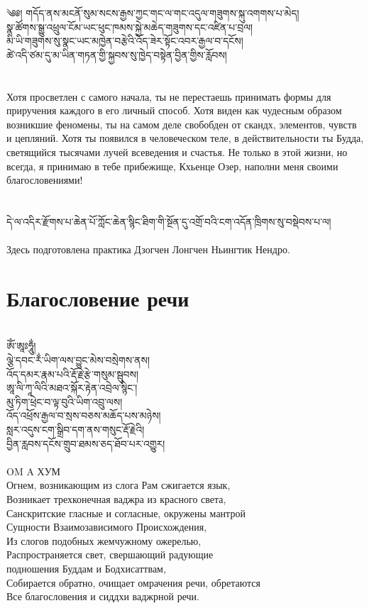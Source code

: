 \small
\ti
༄༅། གདོད་ནས་མངནོ་སུམ་སངས་རྒྱས་ཀྱང་གང་ལ་གང་འདུལ་གཟུགས་སྐུ་འགགས་པ་མེད།\\
སྣ་ཚོགས་སྒྱུ་འཕྲུལ་ངོམ་ཡང་ཕུང་ཁམས་སྐྱེ་མཆེད་གཟུགས་དང་འཛིན་པ་བྲལ།\\
མི་ཡི་གཟུགས་སུ་སྣང་ཡང་མཁྱེན་བརྩེའི་འོད་ཟེར་སྟོང་འབར་རྒྱལ་བ་དངོས།\\
ཚེ་འདི་ཙམ་དུ་མ་ཡིན་གཏན་གྱི་སྐྱབས་སུ་ཁྱེད་བསྟེན་བྱིན་གྱིས་རློབས།\\
\\
\\
\ru
Хотя просветлен с самого начала, ты не перестаешь принимать
формы для приручения каждого в его личный способ.
Хотя виден как чудесным образом возникшие феномены,
ты на самом деле свобобден от скандх, элементов, чувств и цепляний.
Хотя ты появился в человеческом теле, в действительности ты Будда,
светящийся тысячами лучей всеведения и счастья.
Не только в этой жизни, но всегда, я принимаю в тебе прибежище,
Кхьенце Озер, наполни меня своими благословениями!\\
\\
\vspace{0.5cm}
\\
\scriptsize
\ti དེ་ལ་འདིར་རྫོགས་པ་ཆེན་པོ་ཀློང་ཆེན་སྙིང་ཐིག་གི་སྔོན་དུ་འགྲོ་བའི་ངག་འདོན་ཁྲིགས་སུ་བསྡེབས་པ་ལ།\\
\\
\ru Здесь подготовлена практика Дзогчен Лонгчен Ньингтик Нендро.\\


\normalsize
\newpage
\section*{Благословение речи}
\\
\ti
ཨོཾ་ཨཱཿཧཱུྂ།\\
ལྕེ་དབང་རྂ་ཡིག་ལས་བྱུང་མེས་བསྲེགས་ནས། \\
འོད་དམར་རྣམ་པའི་རྡོ་རྗེ་རྩེ་གསུམ་སྦུབས།\\
ཨཱ་ལི་ཀཱ་ལིའི་མཐའ་སྐོར་རྟེན་འབྲེལ་སྙིང་།\\
མུ་ཏིག་ཕྲེང་བ་ལྟ་བུའི་ཡིག་འབྲུ་ལས།\\
འོད་འཕྲོས་རྒྱལ་བ་སྲས་བཅས་མཆོད་པས་མཉེས།\\
སླར་འདུས་ངག་སྒྲིབ་དག་ནས་གསུང་རྡོ་རྗེའི།\\
བྱིན་རླབས་དངོས་གྲུབ་ཐམས་ཅད་ཐོབ་པར་འགྱུར།\\
\\
\ru
OM A ХУМ \\
Огнем, возникающим из слога Рам сжигается язык,\\
Возникает трехконечная ваджра из красного света,\\
Санскритские гласные и согласные, окружены мантрой\\
Сущности Взаимозависимого Происхождения,\\
Из слогов подобных жемчужному ожерелью,\\
Распространяется свет, свершающий радующие \\
подношения Буддам и Бодхисаттвам,\\
Собирается обратно, очищает омрачения речи, обретаются\\
Все благословения и сиддхи ваджрной речи.
\newpage
